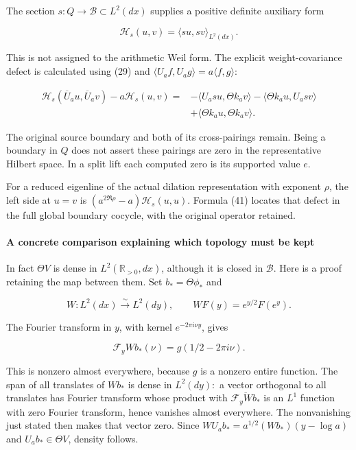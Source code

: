 The section \(s:Q\to\mathscr B\subset L^2(dx)\) supplies a positive definite auxiliary form

\[\mathcal H_s(u,v)=\langle su,sv\rangle_{L^2(dx)}.\]

This is not assigned to the arithmetic Weil form. The explicit weight-covariance defect is
calculated using (29) and \(\langle U_af,U_ag\rangle=a\langle f,g\rangle\):

\[\boxed{\begin{aligned}
\mathcal H_s(\overline U_au,\overline U_av)-a\mathcal H_s(u,v)
={}&-\langle U_asu,\Theta k_av\rangle
-\langle\Theta k_au,U_asv\rangle\\
&+\langle\Theta k_au,\Theta k_av\rangle.
\end{aligned}}\tag{41}\]

The original source boundary and both of its cross-pairings remain. Being a boundary in \(Q\) does
not assert these pairings are zero in the representative Hilbert space. In a split lift each
computed zero is its supported value \(e\).

For a reduced eigenline of the actual dilation representation with exponent \(\rho\), the left side
at \(u=v\) is \((a^{2\Re\rho}-a)\mathcal H_s(u,u)\). Formula (41) locates that defect in the full
global boundary cocycle, with the original operator retained.

\paragraph{A concrete comparison explaining which topology must be
kept}\label{pr_10:a-concrete-comparison-explaining-which-topology-must-be-kept}

In fact \(\Theta V\) is dense in \(L^2(\mathbb R_{>0},dx)\), although it is closed in
\(\mathscr B\). Here is a proof retaining the map between them. Set \(b_*=\Theta\phi_*\) and

\[W:L^2(dx)\xrightarrow{\sim}L^2(dy),\qquad WF(y)=e^{y/2}F(e^y).\]

The Fourier transform in \(y\), with kernel \(e^{-2\pi i\nu y}\), gives

\[\mathcal F_yWb_*(\nu)=g(1/2-2\pi i\nu).\]

This is nonzero almost everywhere, because \(g\) is a nonzero entire function. The span of all
translates of \(Wb_*\) is dense in \(L^2(dy):\) a vector orthogonal to all translates has Fourier
transform whose product with \(\overline{\mathcal F_yWb_*}\) is an \(L^1\) function with zero
Fourier transform, hence vanishes almost everywhere. The nonvanishing just stated then makes that
vector zero. Since \(WU_ab_*=a^{1/2}(Wb_*)(y-\log a)\) and \(U_ab_*\in\Theta V\), density follows.

